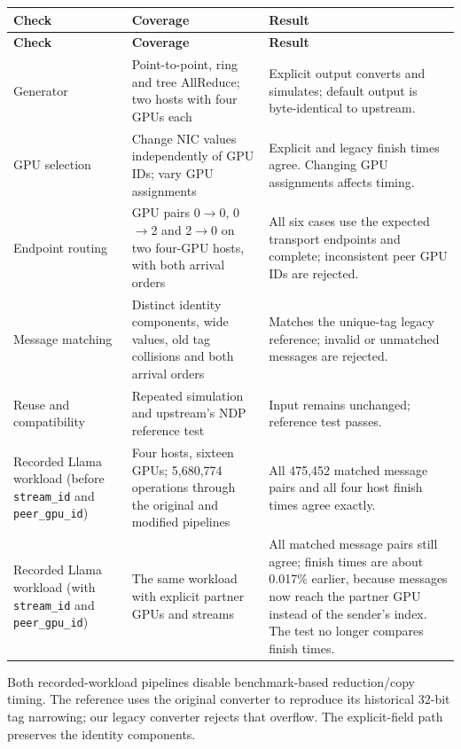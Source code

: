 \documentclass[10pt,a4paper]{article}
\begin{document}
{\small
\begin{longtable}{P{0.22\dimexpr{}\tabcolsep\relax}P{0.37\dimexpr{}\tabcolsep\relax}P{0.41\dimexpr{}\tabcolsep\relax}}
\toprule
\textbf{Check} & \textbf{Coverage} & \textbf{Result} \\
\midrule
\endfirsthead
\toprule
\textbf{Check} & \textbf{Coverage} & \textbf{Result} \\
\midrule
\endhead
\bottomrule
\endfoot
Generator & Point-to-point, ring and tree AllReduce; two hosts with four GPUs each & Explicit output converts and simulates; default output is byte-identical to upstream. \\
GPU selection & Change NIC values independently of GPU IDs; vary GPU assignments & Explicit and legacy finish times agree. Changing GPU assignments affects timing. \\
Endpoint routing & GPU pairs 0\(\rightarrow\)0, 0\(\rightarrow\)2 and 2\(\rightarrow\)0 on two four-GPU hosts, with both arrival orders & All six cases use the expected transport endpoints and complete; inconsistent peer GPU IDs are rejected. \\
Message matching & Distinct identity components, wide values, old tag collisions and both arrival orders & Matches the unique-tag legacy reference; invalid or unmatched messages are rejected. \\
Reuse and compatibility & Repeated simulation and upstream's NDP reference test & Input remains unchanged; reference test passes. \\
Recorded Llama workload (before \texttt{stream\_\allowbreak{}id} and \texttt{peer\_\allowbreak{}gpu\_\allowbreak{}id}) & Four hosts, sixteen GPUs; 5,680,774 operations through the original and modified pipelines & All 475,452 matched message pairs and all four host finish times agree exactly. \\
Recorded Llama workload (with \texttt{stream\_\allowbreak{}id} and \texttt{peer\_\allowbreak{}gpu\_\allowbreak{}id}) & The same workload with explicit partner GPUs and streams & All matched message pairs still agree; finish times are about 0.017\% earlier, because messages now reach the partner GPU instead of the sender's index. The test no longer compares finish times. \\
\end{longtable}
}

Both recorded-workload pipelines disable benchmark-based reduction/copy timing. The reference uses the original converter to reproduce its historical 32-bit tag narrowing; our legacy converter rejects that overflow. The explicit-field path preserves the identity components.
\end{document}
